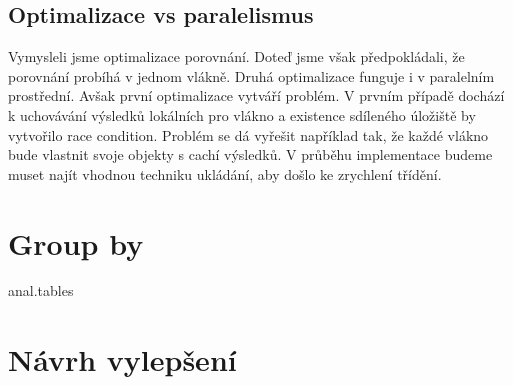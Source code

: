 \subsection{Optimalizace vs paralelismus}

Vymysleli jsme optimalizace porovnání.
Doteď jsme však předpokládali, že porovnání probíhá v jednom vlákně.
Druhá optimalizace funguje i v paralelním prostřední.
Avšak první optimalizace vytváří problém.
V prvním případě dochází k uchovávání výsledků lokálních pro vlákno a existence sdíleného úložiště by vytvořilo race condition.
Problém se dá vyřešit například tak, že každé vlákno bude vlastnit svoje objekty s cachí výsledků.
V průběhu implementace budeme muset najít vhodnou techniku ukládání, aby došlo ke zrychlení třídění.

\section{Group by} {anal.tables}






\section{Návrh vylepšení}
\label{anal.improvement}